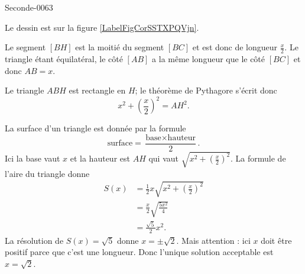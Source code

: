 
\begin{corrige}{Seconde-0063}

Le dessin est sur la figure \ref{LabelFigCorSSTXPQVjn}. %
\newcommand{\CaptionFigCorSSTXPQVjn}{Le triangle équilatéral de l'exercice \ref{exoSeconde-0063}.}


Le segment \( [BH]\) est la moitié du segment \( [BC]\) et est donc de longueur \( \frac{ x }{2}\). Le triangle étant équilatéral, le côté \( [AB]\) a la même longueur que le côté \( [BC]\) et donc \( AB=x\).

Le triangle \( ABH\) est rectangle en \( H\); le théorème de Pythagore s'écrit donc
\begin{equation}
    x^2+\left( \frac{ x }{2} \right)^2=AH^2.
\end{equation}

La surface d'un triangle est donnée par la formule
\begin{equation}
    \text{surface}=\frac{ \text{base}\times\text{hauteur} }{ 2 }.
\end{equation}
Ici la base vaut \( x\) et la hauteur est \( AH\) qui vaut \( \sqrt{x^2+\left( \frac{ x }{2} \right)^2}\). La formule de l'aire du triangle donne
\begin{subequations}
    \begin{align}
        S(x)&=\frac{ 1 }{2}x\sqrt{x^2+\left( \frac{ x }{2} \right)^2}\\
        &=\frac{ x }{2}\sqrt{\frac{ 5x^2 }{ 4 }}\\
        &=\frac{ \sqrt{5} }{ 2 }x^2.
    \end{align}
\end{subequations}
La résolution de \( S(x)=\sqrt{5}\) donne \( x=\pm\sqrt{2}\). Mais attention : ici \( x\) doit être positif parce que c'est une longueur. Donc l'unique solution acceptable est \( x=\sqrt{2}\).

\end{corrige}
